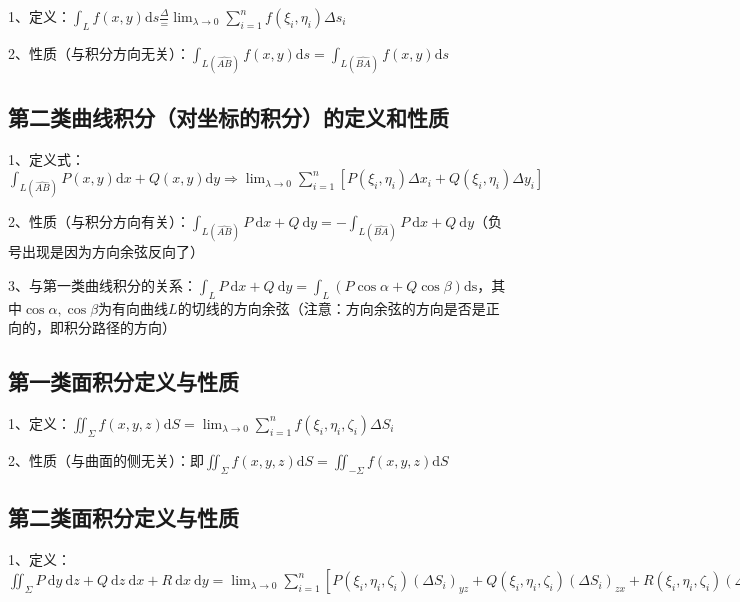 1、定义：$\int_{L} f(x, y) \mathrm{d} s\frac{\Delta}{=} \lim _{\lambda \rightarrow 0} \sum_{i=1}^{n} f\left(\xi_{i}, \eta_{i}\right) \Delta s_{i}$

2、性质（与积分方向无关）：$\int_{L(\widehat{A B})} f(x, y) \mathrm{d} s=\int_{L(\widehat{B A})} f(x, y) \mathrm{d} s$



\subsection{第二类曲线积分（对坐标的积分）的定义和性质}

1、定义式：$\int_{L(\widehat{A B})} P(x, y) \mathrm{d} x+Q(x, y) \mathrm{d} y \Longrightarrow \lim_{\lambda \rightarrow 0} \sum_{i=1}^{n}\left[P\left(\xi_{i}, \eta_{i}\right) \Delta x_{i}+Q\left(\xi_{i}, \eta_{i}\right) \Delta y_{i}\right]$

2、性质（与积分方向有关）：$\int_{L(\widehat{A B})} P \mathrm{~d} x+Q \mathrm{~d} y=-\int_{L(\widehat{B A})} P \mathrm{~d} x+Q \mathrm{~d} y$（负号出现是因为方向余弦反向了）

3、与第一类曲线积分的关系：$\int_{L} P \mathrm{~d} x+Q \mathrm{~d} y=\int_{L}(P \cos \alpha+Q \cos \beta) \mathrm{ds}$，其中$\cos \alpha, \cos \beta$为有向曲线$L$的切线的方向余弦（注意：方向余弦的方向是否是正向的，即积分路径的方向）



\subsection{第一类面积分定义与性质}

1、定义：$\iint_{\Sigma} f(x, y, z) \mathrm{d} S=\lim_{\lambda \rightarrow 0} \sum_{i=1}^{n} f\left(\xi_{i}, \eta_{i}, \zeta_{i}\right) \Delta S_{i}$

2、性质（与曲面的侧无关）：即$\iint_{\Sigma} f(x, y, z) \mathrm{d} S=\iint_{-\Sigma} f(x, y, z) \mathrm{d} S$



\subsection{第二类面积分定义与性质}

1、定义：$\iint_{\Sigma} P \mathrm{~d} y \mathrm{~d} z+Q \mathrm{~d} z \mathrm{~d} x+R \mathrm{~d} x \mathrm{~d} y=\lim _{\lambda \rightarrow 0} \sum_{i=1}^{n}[P\left(\xi_{i}, \eta_{i}, \zeta_{i}\right)\left(\Delta S_{i}\right)_{y z}+Q\left(\xi_{i}, \eta_{i}, \zeta_{i}\right)\left(\Delta S_{i}\right)_{z x}+R\left(\xi_{i}, \eta_{i}, \zeta_{i}\right)\left(\Delta S_{i}\right)_{x y}]$


